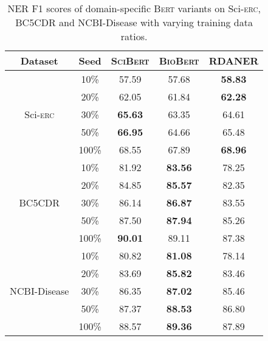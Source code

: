 \documentclass[10pt, conference, compsocconf]{IEEEtran}
\newcommand{\bert}{\textsc{Bert}\xspace}
\newcommand{\scibert}{\textsc{SciBert}\xspace}
\newcommand{\biobert}{\textsc{BioBert}\xspace}
\newcommand{\Scierc}{\textsc{S}ci-\textsc{erc}\xspace}
\newcommand{\rdaner}{\textsc{RDANER}\xspace}
\begin{document}
\begin{table}[t!]
    \caption{NER F1 scores of domain-specific \bert variants on \Scierc, BC5CDR and NCBI-Disease with 
    varying training data ratios.}\label{tal:domain-specific}
    \centering

    \begin{tabular}{c|c|ccc}
        \toprule
    Dataset  &  Seed   &  \scibert  &  \biobert   &     \rdaner   \\ \hline
                          
    \multirow{5}{*}{\Scierc}       & 10\%             & 57.59          & 57.68          & \textbf{58.83}          \\
                                  & 20\%             & 62.05          & 61.84          & \textbf{62.28}         \\
                                  & 30\%              & \textbf{65.63} & 63.35          & 64.61                  \\
                                  & 50\%                & \textbf{66.95} & 64.66          & 65.48               \\
                                  & 100\%            &  68.55          & 67.89          & \textbf{68.96}         \\ \hline
    \multirow{5}{*}{BC5CDR}       & 10\%               & 81.92          & \textbf{83.56} & 78.25                 \\
                                  & 20\%             & 84.85          & \textbf{85.57} & 82.35                 \\
                                  & 30\%              & 86.14          & \textbf{86.87} & 83.55                  \\
                                  & 50\%               & 87.50          & \textbf{87.94} &      85.26            \\
                                  & 100\%             & \textbf{90.01} & 89.11          &        87.38        \\ \hline
    \multirow{5}{*}{NCBI-Disease} & 10\%                 & 80.82          & \textbf{81.08} &       78.14             \\
                                  & 20\%               & 83.69          & \textbf{85.82} &       83.46         \\
                                  & 30\%                 & 86.35          & \textbf{87.02} &     85.46           \\
                                  & 50\%                 & 87.37          & \textbf{88.53} &   86.80       \\
                                  & 100\%                & 88.57          & \textbf{89.36} &   87.89            \\ 
    \bottomrule
    \end{tabular}
    \end{table}
\end{document}
